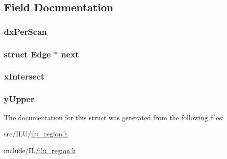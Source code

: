 \subsection{Field Documentation}
\hypertarget{struct_edge_ab19fdfb6f6fe1220d9d306a3235d323d}{
\subsubsection[{dx\-Per\-Scan}]{ dx\-Per\-Scan}}\label{struct_edge_ab19fdfb6f6fe1220d9d306a3235d323d}
\hypertarget{struct_edge_a40a0c9e71e273ece78e764fe02d6e201}{
\subsubsection[{next}]{\setlength{\rightskip}{0pt plus 5cm}struct {\bf Edge} $\ast$ next}}\label{struct_edge_a40a0c9e71e273ece78e764fe02d6e201}
\hypertarget{struct_edge_adaae0c5a47d19f0451262eeefadec888}{
\subsubsection[{x\-Intersect}]{ x\-Intersect}}\label{struct_edge_adaae0c5a47d19f0451262eeefadec888}
\hypertarget{struct_edge_abd58ae01ac30f5cb3e04b8b87767885e}{
\subsubsection[{y\-Upper}]{ y\-Upper}}\label{struct_edge_abd58ae01ac30f5cb3e04b8b87767885e}


The documentation for this struct was generated from the following files\-:\begin{DoxyCompactItemize}
\item 
src/\-I\-L\-U/\hyperlink{src_2_i_l_u_2ilu__region_8h}{ilu\-\_\-region.\-h}\item 
include/\-I\-L/\hyperlink{include_2_i_l_2ilu__region_8h}{ilu\-\_\-region.\-h}\end{DoxyCompactItemize}
